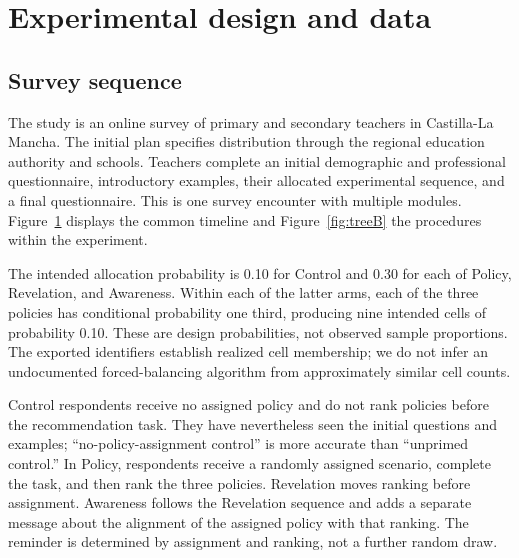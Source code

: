 \section{Experimental design and data}
\subsection{Survey sequence}
The study is an online survey of primary and secondary teachers in Castilla-La Mancha. The initial plan specifies distribution through the regional education authority and schools. Teachers complete an initial demographic and professional questionnaire, introductory examples, their allocated experimental sequence, and a final questionnaire. This is one survey encounter with multiple modules. Figure~\ref{fig:timelineB} displays the common timeline and Figure~\ref{fig:treeB} the procedures within the experiment.

The intended allocation probability is 0.10 for Control and 0.30 for each of Policy, Revelation, and Awareness. Within each of the latter arms, each of the three policies has conditional probability one third, producing nine intended cells of probability 0.10. These are design probabilities, not observed sample proportions. The exported identifiers establish realized cell membership; we do not infer an undocumented forced-balancing algorithm from approximately similar cell counts.

Control respondents receive no assigned policy and do not rank policies before the recommendation task. They have nevertheless seen the initial questions and examples; ``no-policy-assignment control'' is more accurate than ``unprimed control.'' In Policy, respondents receive a randomly assigned scenario, complete the task, and then rank the three policies. Revelation moves ranking before assignment. Awareness follows the Revelation sequence and adds a separate message about the alignment of the assigned policy with that ranking. The reminder is determined by assignment and ranking, not a further random draw.

\begin{figure}[!htbp]\centering\color{added}
\caption{}\label{fig:timelineB}
\end{figure}

